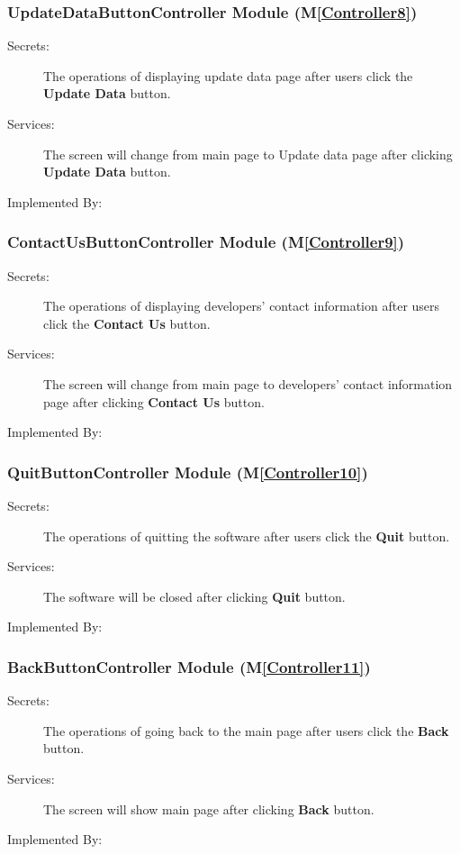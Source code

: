 \documentclass[12pt, titlepage]{article}
\newcommand{\mref}[1]{M\ref{#1}}
\begin{document}
\renewcommand{\bt}{\textbf{Update Data }}
\subsubsection{UpdateDataButtonController Module (\mref{Controller8})}
\begin{description}
\item[Secrets:] The operations of displaying update data page after users click the \bt
 button.
\item[Services:] The screen will change from main page to Update data page after clicking
 \bt button.
\item[Implemented By:] \progname{}
\end{description}

\renewcommand{\bt}{\textbf{Contact Us }}
\subsubsection{ContactUsButtonController Module (\mref{Controller9})}
\begin{description}
\item[Secrets:] The operations of displaying developers' contact information
 after users click the \bt button.
\item[Services:] The screen will change from main page to developers' contact information page
 after clicking \bt button.
\item[Implemented By:] \progname{}
\end{description}

\renewcommand{\bt}{\textbf{Quit }}
\subsubsection{QuitButtonController Module (\mref{Controller10})}
\begin{description}
\item[Secrets:] The operations of quitting the software after users click the \bt button.
\item[Services:] The software will be closed after clicking \bt button.
\item[Implemented By:] \progname{}
\end{description}

\renewcommand{\bt}{\textbf{Back }}
\subsubsection{BackButtonController Module (\mref{Controller11})}
\begin{description}
\item[Secrets:] The operations of going back to the main page after users click the \bt
 button.
\item[Services:] The screen will show main page after clicking \bt button.
\item[Implemented By:] \progname{}
\end{description}
\end{document}
